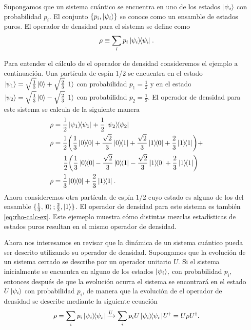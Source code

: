 Supongamos que un sistema cuántico se encuentra en uno de los estados 
$\ket{\psi _i}$ con probabilidad $p_i$. El conjunto $\{p_i,\ket{\psi _i} \}$ 
se conoce como un ensamble de estados puros. El operador de 
densidad para el sistema se define como \cite{nielsen_chuang_2011}
\begin{equation}
	\rho \equiv \sum _i p_i\dyad{\psi_i}{\psi_i}.
	\label{eq:rho_def}
\end{equation}

Para entender el cálculo de el operador de densidad consideremos el ejemplo
a continuación. Una partícula de espín 1/2 se encuentra en el estado 
$\ket{\psi_1}=\sqrt{\frac{1}{3}}\ket{0} + \sqrt{\frac{2}{3}}\ket{1}$
con probabilidad $p_1=\frac{1}{2}$ y en el estado 
$\ket{\psi_2}=\sqrt{\frac{1}{3}}\ket{0} - \sqrt{\frac{2}{3}}\ket{1}$
con probabilidad $p_2=\frac{1}{2}$. El operador de densidad para este 
sistema se calcula de la siguiente manera
\begin{align}
	\rho 	&= \frac{1}{2}\dyad{\psi_1}{\psi_1} + 
	\frac{1}{2}\dyad{\psi_2}{\psi_2} \nonumber \\
	\rho	&= \frac{1}{2}\qty(\frac{1}{3}\dyad{0}{0} +
					 \frac{\sqrt{2}}{3}\dyad{0}{1} + 
					 \frac{\sqrt{2}}{3}\dyad{1}{0} +
					 \frac{2}{3}\dyad{1}{1}) + \nonumber \\
				&\hspace{5mm} \frac{1}{2}\qty(\frac{1}{3}\dyad{0}{0} -
					 \frac{\sqrt{2}}{3}\dyad{0}{1} -
					 \frac{\sqrt{2}}{3}\dyad{1}{0} +
					 \frac{2}{3}\dyad{1}{1}) \nonumber \\
	\rho	&= \frac{1}{3}\dyad{0}{0} + \frac{2}{3}\dyad{1}{1}. 
	\label{eq:rho-calc-ex}
\end{align}
Ahora consideremos otra partícula de espín $1/2$ cuyo estado es alguno de los
del ensamble $\{ \frac{1}{3}, \ket{0}; \frac{2}{3}, \ket{1} \}$. 
El operador de densidad para este sistema es también \eqref{eq:rho-calc-ex}.
Este ejemeplo muestra cómo distintas mezclas estadísticas de estados puros 
resultan en el mismo operador de densidad.\newline

Ahora nos interesamos en revisar que la dinámica de un sistema cuántico
pueda ser descrito utilizando su operador de densidad. 
Supongamos que la evolución de un sistema 
cerrado se describe por un operador unitario $U$. 
Si el sistema inicialmente se encuentra en alguno de los estados 
$\ket{\psi_i}$, con probabilidad $p_i$, entonces después de que
la evolución ocurra el sistema se encontrará en el estado $U\ket{\psi_i}$ 
con probabilidad $p_i$, de manera que la evolución de el operador de densidad
se describe mediante la siguiente ecuación
\begin{align}
	\rho = \sum _ip_i\dyad{\psii}{\psii}
	\xrightarrow[]{U}
	\sum _ip_iU\dyad{\psii}{\psii}U^{\dagger}	=
	U\rho U^{\dagger}.
\end{align}

